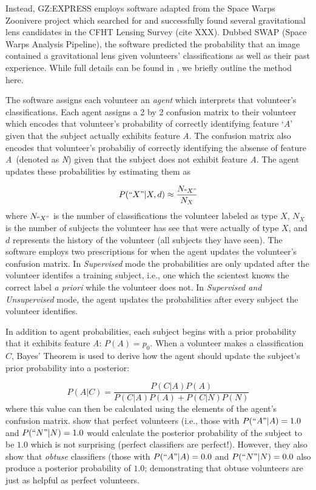 \documentclass[twocolumn]{aastex6}
\newcommand{\A}{\textit{A}}
\newcommand{\N}{\textit{N}}
\begin{document}
Instead, GZ:EXPRESS employs software adapted from the Space Warps Zoonivere project 
\citep{Marshall2016} which searched for and successfully found several gravitational lens 
candidates in the CFHT Lensing Survey (cite XXX).  Dubbed SWAP (Space Warps Analysis Pipeline),  
the software predicted the probability that an image contained a gravitational lens given 
volunteers' classifications as well as their past experience. While full details can be found in 
\cite{Marshall2016}, we briefly outline the method here.  

The software assigns each volunteer an \textit{agent} which interprets that volunteer's 
classifications. Each agent assigns a 2 by 2 confusion matrix to their volunteer which encodes
that volunteer's probability of correctly identifying feature `\A'  given that the subject 
actually exhibits feature \A. The confusion matrix also encodes that volunteer's 
probabiliy of correctly identifying
the absense of feature \A~(denoted as \N) given that the subject does not exhibit 
feature \A. The agent updates these probabilities by estimating them as 

\begin{equation}
P(``X" | X, d) \approx \frac{N_{``X"}}{N_{X}}
\end{equation}
where $N_{``X"}$ is the number of classifications the volunteer labeled as type $X$, 
$N_X$ is the number of subjects the volunteer has see that were actually of type $X$,
and $d$ represents the history of the volunteer (all subjects they have seen). 
The software employs two prescriptions for when the 
agent updates the volunteer's confusion matrix. In \textit{Supervised} mode the 
probabilities are only updated after the volunteer identifes a training subject, 
i.e., one which the scientest knows the correct label \textit{a priori} while the
volunteer does not. In \textit{Supervised and Unsupervised} mode, the agent
updates the probabilities after every subject the volunteer identifies.  

In addition to agent probabilities, each subject begins with a prior probability 
that it exhibits feature \A: $P(A) = p_0$. 
When a volunteer makes a classification $C$, Bayes' Theorem is used to derive how 
the agent should update the subject's prior probability into a posterior: 

\begin{equation}
P(A|C) = \frac{ P(C|A) P(A) }{P(C|A) P(A) + P(C|N) P(N)}
\end{equation}
where this value can then be calculated using the elements of the agent's 
confusion matrix. \cite{Marshall2016} show that perfect volunteers (i.e., those 
with $P(``A"| A) = 1.0$ and $P(``N" | N) = 1.0$ would calculate the posterior
probability of the subject to be $1.0$ which is not surprising (perfect classifiers 
are perfect!). However, they also show that \textit{obtuse} classifiers (those with 
$P(``A" | A) = 0.0$ and $P(``N" | N) = 0.0$ also produce a posterior probability 
of $1.0$; demonstrating that obtuse volunteers are just as helpful as perfect volunteers.
\end{document}
